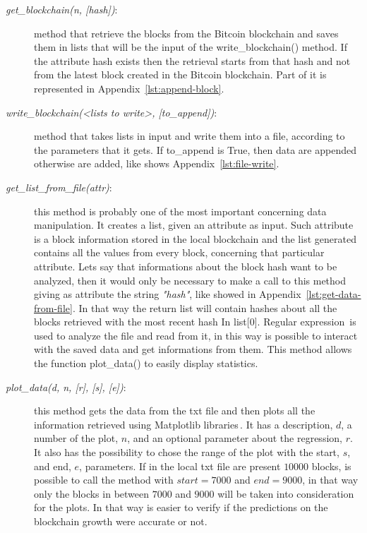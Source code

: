 \documentclass[USenglish]{uit-thesis}
\begin{document}
\begin{description}
	\item [\emph{get\_blockchain(n, [hash])}:] method that retrieve the blocks
	from the Bitcoin blockchain and saves them in lists that will be the input
	of the write\_blockchain() method. If the attribute hash exists then the retrieval
	starts from that hash and not from the latest block created in the Bitcoin blockchain.
	Part of it is represented in Appendix~\ref{lst:append-block}.
	\item [\emph{write\_blockchain(<lists to write>, [to\_append])}:] method that takes lists in input and write them into a file,
	according to the parameters that it gets. If to\_append is True, then data are appended otherwise are added, like
	shows Appendix~\ref{lst:file-write}.
	\item [\emph{get\_list\_from\_file(attr)}:] this method is probably one of the most important concerning data
	manipulation. It creates a list, given an attribute as input. Such attribute is a block information stored in the
	local blockchain and the list generated contains all the values from every block, concerning that
	particular  attribute.
	Lets say that informations about the block hash want to be analyzed, then it would only be necessary
	to make a call to this method giving as attribute the string \emph{"hash"}, like showed in Appendix~\ref{lst:get-data-from-file}.
	In that way the return list will contain hashes about all the blocks retrieved with the most recent hash In list[$0$].
	Regular expression\,\cite{reg_ex} is used to analyze the file and read from it, in this way is possible
	to interact with the saved data and get informations from them. This method allows the
	function plot\_data() to easily display statistics.
	\item [\emph{plot\_data(d, n, [r], [s], [e])}:] this method gets the data from the
	txt file and then plots all the information retrieved using Matplotlib libraries\,\cite{matplotlib}. It has
	a description, $d$, a number of the plot, $n$, and an optional parameter about the
	regression, $r$. It also has the possibility to chose the range of the plot with the start, $s$, and end, $e$,
	parameters. If in the local txt file are present $10000$ blocks, is possible to call the method with
	$start=7000$ and $end=9000$, in that way only the blocks in between $7000$ and $9000$
	will be taken into consideration for the plots. In that way is easier to verify if the predictions on
	the blockchain growth were accurate or not.
\end{description}
\end{document}
